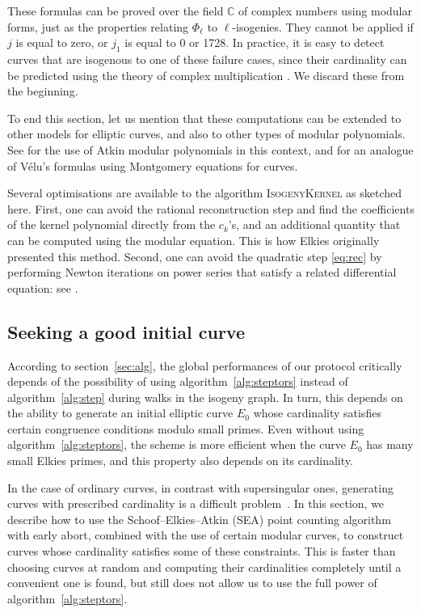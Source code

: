 \documentclass{article}
\newcommand{\C}{\mathbb{C}}
\newcommand{\algstyle}[1]{\textsc{#1}}
\renewcommand{\v}{\vspace{5mm}}
\theoremstyle{definition}
\begin{document}
These formulas can be proved over the field $\C$ of complex numbers using
modular forms, just as the properties relating $\Phi_\ell$ to $\ell$-isogenies.
They cannot be applied if $j$ is equal to zero, or $j_1$ is equal to 0
or 1728. In practice, it is easy to detect curves that are isogenous
to one of these failure cases, since their cardinality can be predicted
using the theory of complex multiplication \cite{}.
We discard these from the beginning.

\v
To end this section, let us mention that these computations can be extended to
other models for elliptic curves, and also to other types of modular polynomials.
See \cite{} for the use of Atkin modular polynomials in this context, and \cite{}
for an analogue of Vélu's formulas using Montgomery equations for curves.

Several optimisations are available to the algorithm \algstyle{IsogenyKernel}
as sketched here. First, one can avoid the rational reconstruction step and
find the coefficients of the kernel polynomial directly from the $c_k$'s,
and an additional quantity that can be computed using the modular equation.
This is how Elkies originally presented this method. Second, one can avoid
the quadratic step \ref{eq:rec} by performing Newton iterations on power
series that satisfy a related differential equation: see \cite{}.


\subsection{Seeking a good initial curve}
\label{sec:initcurve}

According to section~\ref{sec:alg}, the global performances of our protocol
critically depends of the possibility of using algorithm~\ref{alg:steptors}
instead of algorithm~\ref{alg:step} during walks in the isogeny graph.
In turn, this depends on the ability to generate an initial elliptic curve
$E_0$ whose cardinality satisfies certain congruence conditions modulo
small primes. Even without using algorithm~\ref{alg:steptors}, the scheme is
more efficient when the curve $E_0$ has many small Elkies primes, and this
property also depends on its cardinality.

In the case of ordinary curves, in contrast with supersingular ones,
generating curves with prescribed cardinality is a difficult problem~\cite{todo}.
In this section, we describe how to use the Schoof--Elkies--Atkin (SEA) point counting
algorithm with early abort, combined with the use of certain modular curves,
to construct curves whose cardinality satisfies some of these constraints.
This is faster than choosing curves at random and computing their cardinalities
completely until a convenient one is found, but still does not allow us
to use the full power of algorithm~\ref{alg:steptors}.
\end{document}
